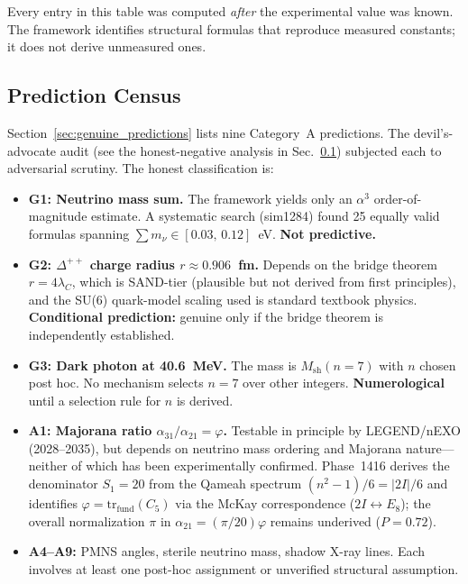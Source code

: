 \documentclass[aps,prd,twocolumn,superscriptaddress,floatfix,nofootinbib]{revtex4-2}
\theoremstyle{definition}
\theoremstyle{remark}
\newcommand{\vp}{\varphi}
\begin{document}
\noindent
Every entry in this table was computed \emph{after} the experimental
value was known.  The framework identifies structural formulas that
reproduce measured constants; it does not derive unmeasured ones.

\subsection{Prediction Census}
\label{sec:prediction-census}

Section~\ref{sec:genuine_predictions} lists nine Category~A predictions.
The devil's-advocate audit (see the honest-negative analysis in Sec.~\ref{sec:prediction-census}) subjected
each to adversarial scrutiny.  The honest classification is:

\begin{itemize}
\item \textbf{G1: Neutrino mass sum.}  The framework yields only an
      $\alpha^3$ order-of-magnitude estimate.  A systematic search
      (sim1284) found 25 equally valid formulas spanning
      $\sum m_\nu \in [0.03,\, 0.12]$~eV.  \textbf{Not predictive.}

\item \textbf{G2: $\Delta^{++}$ charge radius $r \approx 0.906$~fm.}
      Depends on the bridge theorem $r = 4\lambda_C$, which is
      SAND-tier (plausible but not derived from first principles), and
      the SU(6) quark-model scaling used is standard textbook physics.
      \textbf{Conditional prediction:} genuine only if the bridge
      theorem is independently established.

\item \textbf{G3: Dark photon at 40.6~MeV.}  The mass is
      $M_\text{sh}(n{=}7)$ with $n$ chosen post hoc.  No mechanism
      selects $n{=}7$ over other integers.  \textbf{Numerological}
      until a selection rule for $n$ is derived.

\item \textbf{A1: Majorana ratio $\alpha_{31}/\alpha_{21} = \vp$.}
      Testable in principle by LEGEND/nEXO (2028--2035), but depends
      on neutrino mass ordering and Majorana nature---neither of which
      has been experimentally confirmed.  Phase~1416 derives the
      denominator $S_1{=}20$ from the Qameah spectrum
      $(n^2-1)/6 = |2I|/6$ and identifies $\vp = \mathrm{tr}_{\mathrm{fund}}(C_5)$
      via the McKay correspondence ($2I\leftrightarrow E_8$); the overall
      normalization $\pi$ in $\alpha_{21} = (\pi/20)\vp$ remains underived
      ($P=0.72$).

\item \textbf{A4--A9:} PMNS angles, sterile neutrino mass, shadow
      X-ray lines.  Each involves at least one post-hoc assignment or
      unverified structural assumption.
\end{itemize}
\end{document}
